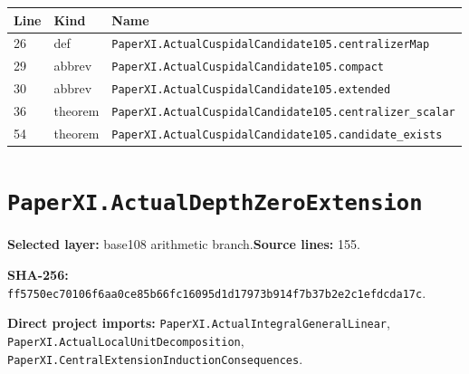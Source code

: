 \documentclass[10pt,oneside]{book}
\begin{document}
\begin{longtable}{@{}p{}p{}p{}@{}}\toprule Line&Kind&Name\\\midrule\endhead

26&def&\nolinkurl{PaperXI.ActualCuspidalCandidate105.centralizerMap}\\

29&abbrev&\nolinkurl{PaperXI.ActualCuspidalCandidate105.compact}\\

30&abbrev&\nolinkurl{PaperXI.ActualCuspidalCandidate105.extended}\\

36&theorem&\nolinkurl{PaperXI.ActualCuspidalCandidate105.centralizer_scalar}\\

54&theorem&\nolinkurl{PaperXI.ActualCuspidalCandidate105.candidate_exists}\\

\bottomrule\end{longtable}

\section{\texorpdfstring{\nolinkurl{PaperXI.ActualDepthZeroExtension}}{PaperXI.ActualDepthZeroExtension}}\label{module:PaperXI.ActualDepthZeroExtension}

\textbf{Selected layer:} base108 arithmetic branch.\quad\textbf{Source lines:} 155.\par\textbf{SHA-256:} {\scriptsize\nolinkurl{ff5750ec70106f6aa0ce85b66fc16095d1d17973b914f7b37b2e2c1efdcda17c}}.


\textbf{Direct project imports:} \nolinkurl{PaperXI.ActualIntegralGeneralLinear}, \nolinkurl{PaperXI.ActualLocalUnitDecomposition}, \nolinkurl{PaperXI.CentralExtensionInductionConsequences}.
\end{document}
